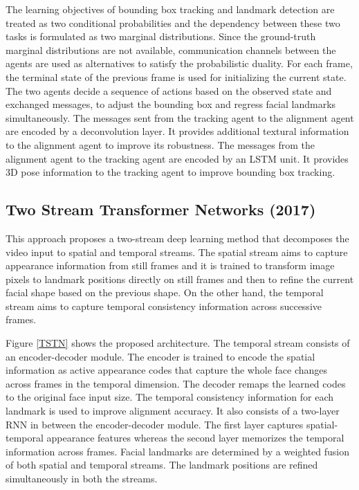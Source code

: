 \documentclass{llncs}
\begin{document}
The learning objectives of bounding box tracking and landmark detection are treated as two conditional probabilities and the dependency between these two tasks is formulated as two marginal distributions. Since the ground-truth marginal distributions are not available, communication channels between the agents are used as alternatives to satisfy the probabilistic duality. For each frame, the terminal state of the previous frame is used for initializing the current state. The two agents decide a sequence of actions based on the observed state and exchanged messages, to adjust the bounding box and regress facial landmarks simultaneously. The messages sent from the tracking agent to the alignment agent are encoded by a deconvolution layer. It provides additional textural information to the alignment agent to improve its robustness. The messages from the alignment agent to the tracking agent are encoded by an LSTM unit. It provides 3D pose information to the tracking agent to improve bounding box tracking.\\


\subsection{Two Stream Transformer Networks (2017) \cite{tstn}}

This approach proposes a two-stream deep learning method that decomposes the video input to spatial and temporal streams. The spatial stream aims to capture appearance information from still frames and it is trained to transform image pixels to landmark positions directly on still frames and then to refine the current facial shape based on the previous shape. On the other hand, the temporal stream aims to capture temporal consistency information across successive frames. 

Figure \ref{TSTN} shows the proposed architecture. The temporal stream consists of an encoder-decoder module. The encoder is trained to encode the spatial information as active appearance codes that capture the whole face changes across frames in the temporal dimension. The decoder remaps the learned codes to the original face input size. The temporal consistency information for each landmark is used to improve alignment accuracy. It also consists of a two-layer RNN in between the encoder-decoder module. The first layer captures spatial-temporal appearance features whereas the second layer memorizes the temporal information across frames. Facial landmarks are determined by a weighted fusion of both spatial and temporal streams. The landmark positions are refined simultaneously in both the streams.
\end{document}
